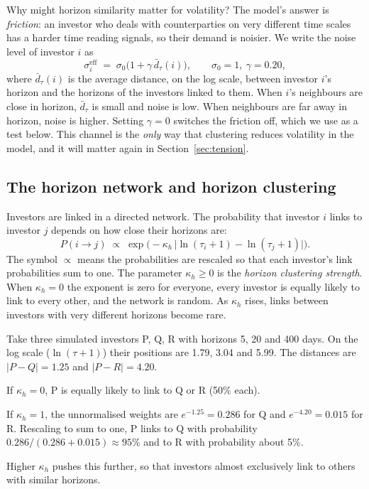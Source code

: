 Why might horizon similarity matter for volatility? The model's answer is \emph{friction}: an investor who deals with counterparties on very different time scales has a harder time reading signals, so their demand is noisier. We write the noise level of investor $i$ as
\begin{equation}
\sigma^{\mathrm{eff}}_i \;=\; \sigma_0\big(1+\gamma\,\bar d_\tau(i)\big), \qquad \sigma_0 = 1,\ \gamma = 0.20,
\label{eq:sigeff}
\end{equation}
where $\bar d_\tau(i)$ is the average distance, on the log scale, between investor $i$'s horizon and the horizons of the investors linked to them. When $i$'s neighbours are close in horizon, $\bar d_\tau$ is small and noise is low. When neighbours are far away in horizon, noise is higher. Setting $\gamma=0$ switches the friction off, which we use as a test below. This channel is the \emph{only} way that clustering reduces volatility in the model, and it will matter again in Section~\ref{sec:tension}.

\subsection{The horizon network and horizon clustering}

Investors are linked in a directed network. The probability that investor $i$ links to investor $j$ depends on how close their horizons are:
\begin{equation}
P(i\to j) \;\propto\; \exp\!\big(-\kappa_h\,\big|\ln(\tau_i+1)-\ln(\tau_j+1)\big|\big).
\label{eq:network}
\end{equation}
The symbol $\propto$ means the probabilities are rescaled so that each investor's link probabilities sum to one. The parameter $\kappa_h\ge 0$ is the \emph{horizon clustering strength}. When $\kappa_h=0$ the exponent is zero for everyone, every investor is equally likely to link to every other, and the network is random. As $\kappa_h$ rises, links between investors with very different horizons become rare.

\begin{example}
Take three simulated investors P, Q, R with horizons 5, 20 and 400 days. On the log scale ($\ln(\tau+1)$) their positions are 1.79, 3.04 and 5.99. The distances are $|P-Q|=1.25$ and $|P-R|=4.20$.

If $\kappa_h=0$, P is equally likely to link to Q or R (50\% each).

If $\kappa_h=1$, the unnormalised weights are $e^{-1.25}=0.286$ for Q and $e^{-4.20}=0.015$ for R. Rescaling to sum to one, P links to Q with probability $0.286/(0.286+0.015)\approx 95\%$ and to R with probability about 5\%.

Higher $\kappa_h$ pushes this further, so that investors almost exclusively link to others with similar horizons.
\end{example}

